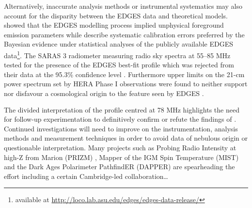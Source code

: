 Alternatively, inaccurate analysis methods or instrumental systematics may also account for the disparity between the EDGES data and theoretical models. \citet{hills_concerns} showed that the EDGES modelling process implied unphysical foreground emission parameters while \citet{sims_concerns} describe systematic calibration errors preferred by the Bayesian evidence under statistical analyses of the publicly available EDGES data\footnote{available at \url{http://loco.lab.asu.edu/edges/edges-data-release/}}. The SARAS 3 radiometer measuring radio sky spectra at 55--85 MHz tested for the presence of the EDGES best-fit profile which was rejected from their data at the 95.3\% confidence level \citep{saras_reject}. Furthermore upper limits on the 21-cm power spectrum set by HERA Phase I observations were found to neither support nor disfavour a cosmological origin to the feature seen by EDGES \citep{hera_limits}.

The divided interpretation of the profile centred at 78 MHz highlights the need for follow-up experimentation to definitively confirm or refute the findings of \citet{edgesNature}. Continued investigations will need to improve on the instrumentation, analysis methods and measurement techniques in order to avoid data of nebulous origin or questionable interpretation. Many projects such as Probing Radio Intensity at high-Z from Marion (PRIZM) \citep{prizm}, Mapper of the IGM Spin Temperature (MIST) \citep{mist} and the Dark Ages Polarimeter PathfindER (DAPPER) \citep{dapper} are spearheading the effort including a certain Cambridge-led collaboration…


